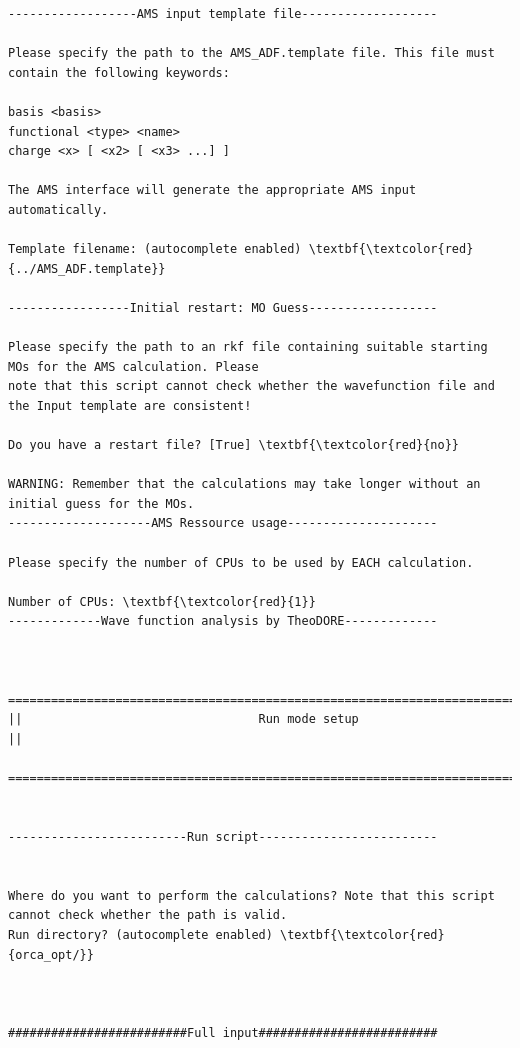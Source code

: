 \documentclass[a4paper,11pt,DIV=15,openany]{scrbook}
\begin{document}
\begin{oframed}
\begin{Verbatim}[commandchars=\\\{\}]
------------------AMS input template file-------------------

Please specify the path to the AMS_ADF.template file. This file must contain the following keywords:

basis <basis>
functional <type> <name>
charge <x> [ <x2> [ <x3> ...] ]

The AMS interface will generate the appropriate AMS input automatically.

Template filename: (autocomplete enabled) \textbf{\textcolor{red}{../AMS_ADF.template}}

-----------------Initial restart: MO Guess------------------

Please specify the path to an rkf file containing suitable starting MOs for the AMS calculation. Please 
note that this script cannot check whether the wavefunction file and the Input template are consistent!

Do you have a restart file? [True] \textbf{\textcolor{red}{no}}

WARNING: Remember that the calculations may take longer without an initial guess for the MOs.
--------------------AMS Ressource usage---------------------

Please specify the number of CPUs to be used by EACH calculation.

Number of CPUs: \textbf{\textcolor{red}{1}}
-------------Wave function analysis by TheoDORE-------------


  ================================================================================
||                                 Run mode setup                                 ||
  ================================================================================


-------------------------Run script-------------------------


Where do you want to perform the calculations? Note that this script cannot check whether the path is valid.
Run directory? (autocomplete enabled) \textbf{\textcolor{red}{orca_opt/}}



#########################Full input#########################


\end{Verbatim}
\end{oframed}
\end{document}
